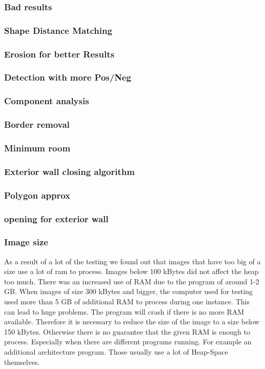 \subsubsection{Bad results}
\subsubsection{Shape Distance Matching}
\subsubsection{Erosion for better Results}
\subsubsection{Detection with more Pos/Neg}
\subsubsection{Component analysis}
\subsubsection{Border removal}
\subsubsection{Minimum room}
\subsubsection{Exterior wall closing algorithm}
\subsubsection{Polygon approx}
\subsubsection{opening for exterior wall}
\subsubsection{Image size}
As a result of a lot of the testing we found out that images that have too big of a size use a lot of ram to process. Images below 100 kBytes did not affect the heap too much. There was an increased use of RAM due to the program of around 1-2 GB. When images of size 300 kBytes and bigger, the computer used for testing used more than 5 GB of additional RAM to process during one instance. This can lead to huge problems. The program will crash if there is no more RAM available. Therefore it is necessary to reduce the size of the image to a size below 150 kBytes. Otherwise there is no guarantee that the given RAM is enough to process. Especially when there are different programs running. For example an additional architecture program. Those usually use a lot of Heap-Space themselves. 

